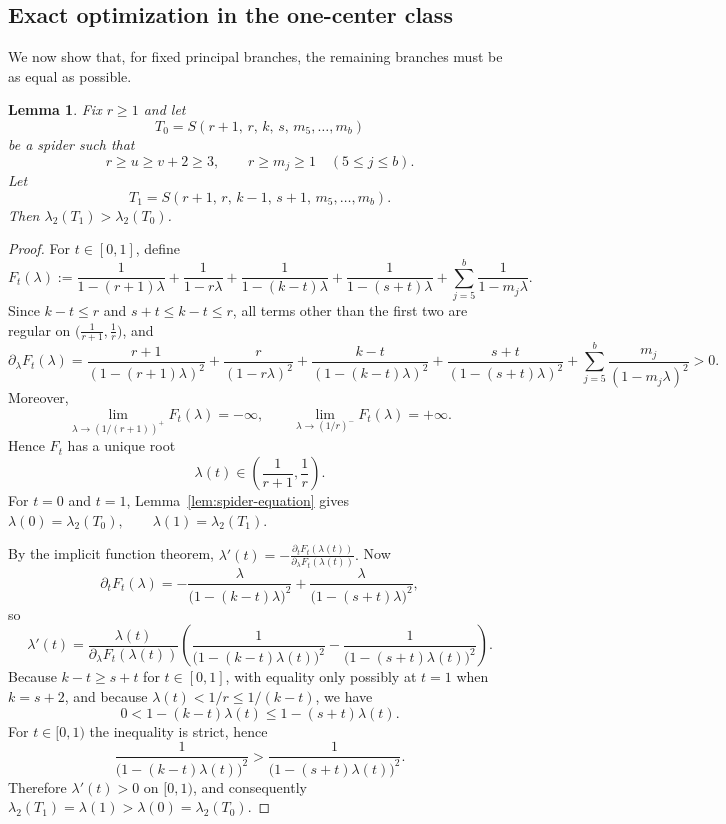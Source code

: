 \documentclass[11pt]{article}
\newtheorem{lemma}[theorem]{Lemma}
\theoremstyle{remark}
\begin{document}
\subsection{Exact optimization in the one-center class}
We now show that, for fixed principal branches, the remaining branches must be as equal as possible.

\begin{lemma}\label{lem:balance-side}
Fix $r\ge 1$ and let
$$
T_0=S(r+1,\,r,\,k,\,s,\,m_5,\dots,m_b)
$$
be a spider such that
$$
r\ge u\ge v+2\ge 3,
\qquad
r\ge m_j\ge 1 \quad (5\le j\le b).
$$
Let
$$
T_1=S(r+1,\,r,\,k-1,\,s+1,\,m_5,\dots,m_b).
$$
Then $\lambda_2(T_1)>\lambda_2(T_0)$.
\end{lemma}

\begin{proof}
For $t\in[0,1]$, define
$$
F_t(\lambda):=
\frac1{1-(r+1)\lambda}
+
\frac1{1-r\lambda}
+
\frac1{1-(k-t)\lambda}
+
\frac1{1-(s+t)\lambda}
+
\sum_{j=5}^b \frac1{1-m_j\lambda}.
$$
Since $k-t\le r$ and $s+t\le k-t\le r$, all terms other than the first two are regular on
$\bigl(\frac1{r+1},\frac1r\bigr)$, and
$$
\partial_\lambda F_t(\lambda)
=
\frac{r+1}{(1-(r+1)\lambda)^2}
+
\frac{r}{(1-r\lambda)^2}
+
\frac{k-t}{(1-(k-t)\lambda)^2}
+
\frac{s+t}{(1-(s+t)\lambda)^2}
+
\sum_{j=5}^b \frac{m_j}{(1-m_j\lambda)^2}
>0.
$$
Moreover,
$$
\lim_{\lambda\to (1/(r+1))^+}F_t(\lambda)=-\infty,
\qquad
\lim_{\lambda\to (1/r)^-}F_t(\lambda)=+\infty.
$$
Hence $F_t$ has a unique root
$$
\lambda(t)\in\left(\frac1{r+1},\frac1r\right).
$$
For $t=0$ and $t=1$, Lemma~\ref{lem:spider-equation} gives
$\lambda(0)=\lambda_2(T_0), \qquad \lambda(1)=\lambda_2(T_1).$

By the implicit function theorem,
$\lambda'(t)=-\frac{\partial_t F_t(\lambda(t))}{\partial_\lambda F_t(\lambda(t))}.$
Now
$$
\partial_t F_t(\lambda)
=
-\frac{\lambda}{\bigl(1-(k-t)\lambda\bigr)^2}
+
\frac{\lambda}{\bigl(1-(s+t)\lambda\bigr)^2},
$$
so
$$
\lambda'(t)
=
\frac{\lambda(t)}{\partial_\lambda F_t(\lambda(t))}
\left(
\frac{1}{\bigl(1-(k-t)\lambda(t)\bigr)^2}
-
\frac{1}{\bigl(1-(s+t)\lambda(t)\bigr)^2}
\right).
$$
Because $k-t\ge s+t$ for $t\in[0,1]$, with equality only possibly at $t=1$ when $k=s+2$, and because
$\lambda(t)<1/r\le 1/(k-t)$, we have
$$
0<1-(k-t)\lambda(t)\le 1-(s+t)\lambda(t).
$$
For $t\in[0,1)$ the inequality is strict, hence
$$
\frac{1}{\bigl(1-(k-t)\lambda(t)\bigr)^2}
>
\frac{1}{\bigl(1-(s+t)\lambda(t)\bigr)^2}.
$$
Therefore $\lambda'(t)>0$ on $[0,1)$, and consequently
$\lambda_2(T_1)=\lambda(1)>\lambda(0)=\lambda_2(T_0).$
\end{proof}
\end{document}
